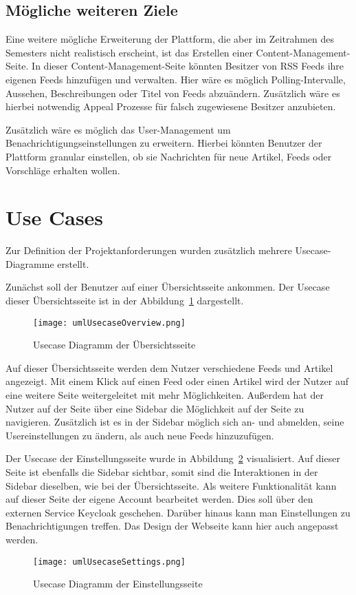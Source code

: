 \subsection{Mögliche weiteren Ziele}
Eine weitere mögliche Erweiterung der Plattform, die aber im Zeitrahmen des Semesters nicht realistisch erscheint, ist das Erstellen einer Content-Management-Seite.
In dieser Content-Management-Seite könnten Besitzer von RSS Feeds ihre eigenen Feeds hinzufügen und verwalten.
Hier wäre es möglich Polling-Intervalle, Aussehen, Beschreibungen oder Titel von Feeds abzuändern.
Zusätzlich wäre es hierbei notwendig Appeal Prozesse für falsch zugewiesene Besitzer anzubieten.

Zusätzlich wäre es möglich das User-Management um Benachrichtigungseinstellungen zu erweitern. 
Hierbei könnten Benutzer der Plattform granular einstellen, ob sie Nachrichten für neue Artikel, Feeds oder Vorschläge erhalten wollen.

\section{Use Cases}
Zur Definition der Projektanforderungen wurden zusätzlich mehrere Usecase-Diagramme erstellt.

Zunächst soll der Benutzer auf einer Übersichtsseite ankommen.
Der Usecase dieser Übersichtsseite ist in der Abbildung~\ref{fig:usecaseOverview} dargestellt.
\begin{figure}
    \texttt{[image: umlUsecaseOverview.png]}
    \caption{Usecase Diagramm der Übersichtsseite}
    \label{fig:usecaseOverview}
\end{figure}
Auf dieser Übersichtsseite werden dem Nutzer verschiedene Feeds und Artikel angezeigt. Mit einem Klick auf einen Feed oder einen Artikel wird
der Nutzer auf eine weitere Seite weitergeleitet mit mehr Möglichkeiten. Außerdem hat der Nutzer auf der Seite über eine Sidebar die Möglichkeit
auf der Seite zu navigieren. Zusätzlich ist es in der Sidebar möglich  sich an- und abmelden, seine Usereinstellungen zu ändern, als auch neue Feeds
hinzuzufügen. 

Der Usecase der Einstellungsseite wurde in Abbildung~\ref{fig:usecaseSettings} visualisiert.
Auf dieser Seite ist ebenfalls die Sidebar sichtbar, somit sind die Interaktionen in der Sidebar dieselben, wie
bei der Übersichtsseite. Als weitere Funktionalität kann auf dieser Seite der eigene Account bearbeitet werden.
Dies soll über den externen Service Keycloak geschehen. Darüber hinaus
kann man Einstellungen zu Benachrichtigungen treffen. Das Design der
Webseite kann hier auch angepasst werden.
\begin{figure}
    \texttt{[image: umlUsecaseSettings.png]}
    \caption{Usecase Diagramm der Einstellungsseite}
    \label{fig:usecaseSettings}
\end{figure}


